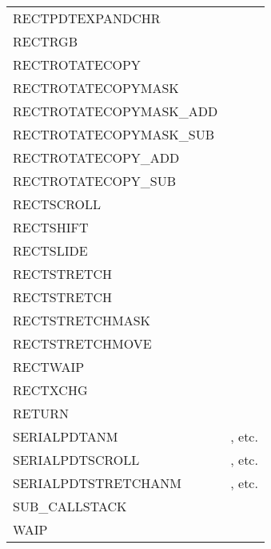 {\begin{supertabular}{l@{\hs}l}
  RECTPDTEXPANDCHR          &           \\
  RECTRGB                   &             \\
  RECTROTATECOPY            &             \\
  RECTROTATECOPYMASK        &         \\
  RECTROTATECOPYMASK\_ADD   &      \\
  RECTROTATECOPYMASK\_SUB   &      \\
  RECTROTATECOPY\_ADD       &          \\
  RECTROTATECOPY\_SUB       &          \\
  RECTSCROLL                &                \\
  RECTSHIFT                 &              \\
  RECTSLIDE                 &              \\
  RECTSTRETCH               &     \\
  RECTSTRETCH               &         \\
  RECTSTRETCHMASK           &\\
  RECTSTRETCHMOVE           &               \\
  RECTWAIP                  &\\
  RECTXCHG                  &               \\
  RETURN                    &                   \\
  SERIALPDTANM              & \rm{, etc.}   \\
  SERIALPDTSCROLL           & \rm{, etc.} \\
  SERIALPDTSTRETCHANM       & \rm{, etc.}\\
  SUB\_CALLSTACK            &          \\
  WAIP                      &            \\
\end{supertabular}}
\
